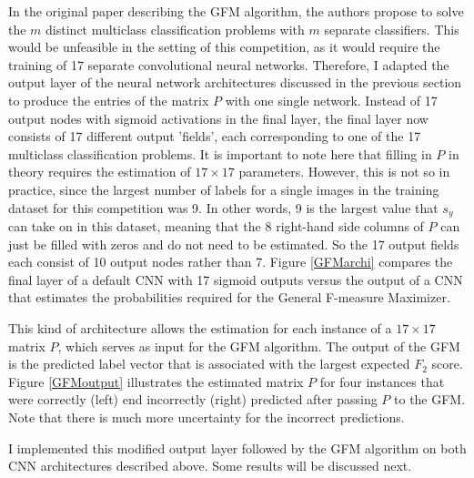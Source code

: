 \documentclass[fleqn]{homework}
\begin{document}
In the original paper describing the GFM algorithm, the authors propose to solve the $m$ distinct multiclass classification problems with $m$ separate classifiers. This would be unfeasible in the setting of this competition, as it would require the training of 17 separate convolutional neural networks. Therefore, I adapted the output layer of the neural network architectures discussed in the previous section to produce the entries of the matrix $P$ with one single network. Instead of 17 output nodes with sigmoid activations in the final layer, the final layer now consists of 17 different output 'fields', each corresponding to one of the 17 multiclass classification problems. It is important to note here that filling in $P$ in theory requires the estimation of $17 \times 17$ parameters. However, this is not so in practice, since the largest number of labels for a single images in the training dataset for this competition was 9. In other words, 9 is the largest value that $s_y$ can take on in this dataset, meaning that the 8 right-hand side columns of $P$ can just be filled with zeros and do not need to be estimated. So the 17 output fields each consist of 10 output nodes rather than 7. Figure \ref{GFMarchi} compares the final layer of a default CNN with 17 sigmoid outputs versus the output of a CNN that estimates the probabilities required for the General F-measure Maximizer.

This kind of architecture allows the estimation for each instance of a $17 \times 17$ matrix $P$, which serves as input for the GFM algorithm. The output of the GFM is the predicted label vector that is associated with the largest expected $F_2$ score. Figure \ref{GFMoutput} illustrates the estimated matrix $P$ for four instances that were correctly (left) end incorrectly (right) predicted after passing $P$ to the GFM. Note that there is much more uncertainty for the incorrect predictions. 

I implemented this modified output layer followed by the GFM algorithm on both CNN architectures described above. Some results will be discussed next.
\end{document}
